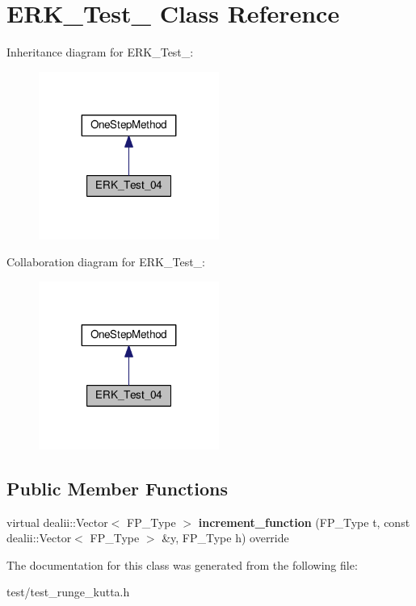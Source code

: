 \hypertarget{classERK__Test__04}{}\section{E\+R\+K\+\_\+\+Test\+\_ Class Reference}
\label{classERK__Test__04}


Inheritance diagram for E\+R\+K\+\_\+\+Test\+\_\+:\nopagebreak
\begin{figure}[H]
\begin{center}
\leavevmode
\includegraphics[width=167pt]{classERK__Test__04__inherit__graph}
\end{center}
\end{figure}


Collaboration diagram for E\+R\+K\+\_\+\+Test\+\_\+:\nopagebreak
\begin{figure}[H]
\begin{center}
\leavevmode
\includegraphics[width=167pt]{classERK__Test__04__coll__graph}
\end{center}
\end{figure}
\subsection*{Public Member Functions}
\begin{DoxyCompactItemize}
\item 
\mbox{\label{classERK__Test__04_af4dae610075271a689c9442bd160cd33}} 
virtual dealii\+::\+Vector$<$ F\+P\+\_\+\+Type $>$ {\bfseries increment\+\_\+function} (F\+P\+\_\+\+Type t, const dealii\+::\+Vector$<$ F\+P\+\_\+\+Type $>$ \&y, F\+P\+\_\+\+Type h) override
\end{DoxyCompactItemize}


The documentation for this class was generated from the following file\+:\begin{DoxyCompactItemize}
\item 
test/test\+\_\+runge\+\_\+kutta.\+h\end{DoxyCompactItemize}

